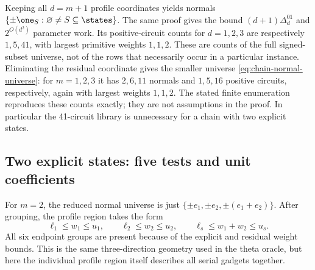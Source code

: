 \begin{remark}\label{rem:unreduced-chain}
Keeping all $d=m+1$ profile coordinates yields normals
$\{\pm\one_S:\varnothing\ne S\subseteq\states\}$.
The same proof gives the bound $(d+1)\Delta^{01}_d$ and
$2^{O(d^2)}$ parameter work. Its positive-circuit counts for
$d=1,2,3$ are respectively $1,5,41$, with largest primitive
weights $1,1,2$. These are counts of the full signed-subset universe,
not of the rows that necessarily occur in a particular instance.
Eliminating the residual coordinate gives the smaller universe
\eqref{eq:chain-normal-universe}: for $m=1,2,3$ it has
$2,6,11$ normals and $1,5,16$ positive circuits, respectively,
again with largest weights $1,1,2$. The stated finite enumeration
reproduces these counts exactly; they are not assumptions in the
proof. In particular the 41-circuit library is unnecessary for a
chain with two explicit states.
\end{remark}

\subsection{Two explicit states: five tests and unit coefficients}

For $m=2$, the reduced normal universe is just
$\{\pm e_1,\pm e_2,\pm(e_1+e_2)\}$. After grouping, the
profile region takes the form
\begin{equation}\label{eq:chain-hexagon}
 \ell_1\le w_1\le u_1,\qquad
 \ell_2\le w_2\le u_2,\qquad
 \ell_s\le w_1+w_2\le u_s.
\end{equation}
All six endpoint groups are present because of the explicit and
residual weight bounds. This is the same three-direction geometry
used in the theta oracle, but here the individual profile region
itself describes all serial gadgets together.

